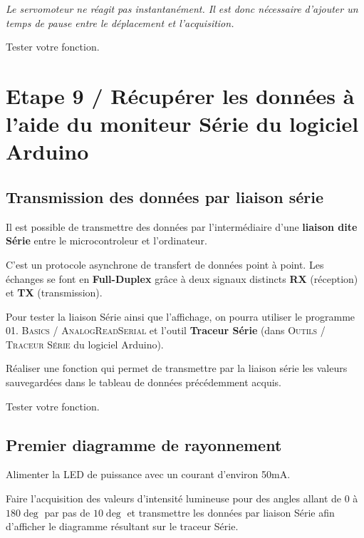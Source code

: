 \documentclass[a4paper,11pt,titlepage]{article} %
\begin{document}
\textit{Le servomoteur ne réagit pas instantanément. Il est donc nécessaire d'ajouter un temps de pause entre le déplacement et l'acquisition.}

\Manip Tester votre fonction.


\section{Etape 9 / Récupérer les données à l'aide du moniteur Série du logiciel Arduino}

\subsection{Transmission des données par liaison série}

Il est possible de transmettre des données par l'intermédiaire d'une \textbf{liaison dite Série} entre le microcontroleur et l'ordinateur.

C'est un protocole asynchrone de transfert de données point à point. Les échanges se font en \textbf{Full-Duplex} grâce à deux signaux distincts \textbf{RX} (réception) et \textbf{TX} (transmission).

\medskip

Pour tester la liaison Série ainsi que l'affichage, on pourra utiliser le programme \textsc{01. Basics / AnalogReadSerial} et l'outil \textbf{Traceur Série} (dans \textsc{Outils / Traceur Série} du logiciel Arduino).


\Manip Réaliser une fonction qui permet de transmettre par la liaison série les valeurs sauvegardées dans le tableau de données précédemment acquis.

\Manip Tester votre fonction.

\subsection{Premier diagramme de rayonnement}

\Manip Alimenter la LED de puissance avec un courant d'environ 50mA.

\Manip Faire l'acquisition des valeurs d'intensité lumineuse pour des angles allant de $0$ à $180\deg{}$ par pas de $10\deg{}$ et transmettre les données par liaison Série afin d'afficher le diagramme résultant sur le traceur Série.


\cleardoublepage
\strut %
\end{document}
